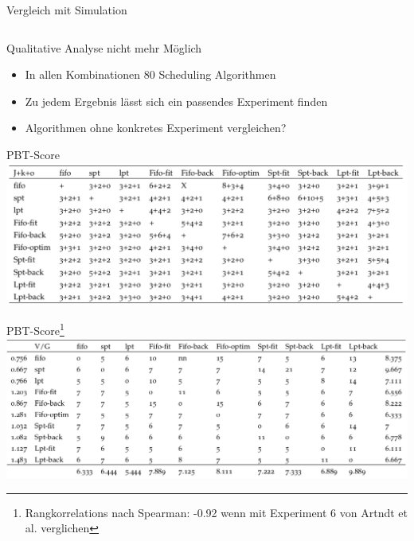 \documentclass[aspectratio=169,10pt]{beamer}
\begin{document}
\begin{frame}[t, fragile]{Vergleich mit Simulation}
\begin{columns}
\begin{column}[c]{0.5\paperwidth}
		\end{column}
	\end{columns}
\end{frame}

\begin{frame}[t,fragile]{Qualitative Analyse nicht mehr M\"oglich}
	\begin{itemize}
		\item In allen Kombinationen 80 Scheduling Algorithmen
		\item Zu jedem Ergebnis l\"asst sich ein passendes Experiment finden
		\item Algorithmen ohne konkretes Experiment vergleichen?
	\end{itemize}
\end{frame}

\begin{frame}[fragile]{PBT-Score}
		\vspace{0.5pt}
		\includegraphics[width=\linewidth, clip]{images/SchedulerX.png}
\end{frame}
\begin{frame}[fragile]{PBT-Score\footnote{Rangkorrelations nach Spearman: -0.92 wenn mit Experiment 6 von Artndt et al. verglichen}}
\vspace{0.5pt}
\includegraphics[width=\linewidth, clip]{images/SchedulerXScore.png}
\end{frame}
\end{document}

